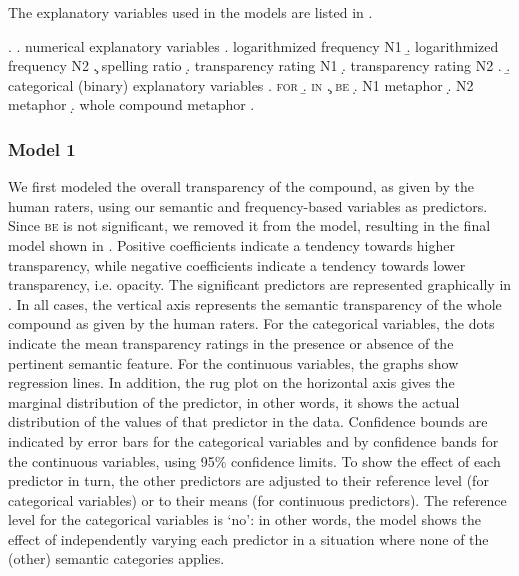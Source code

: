 The explanatory variables used in the models are listed in \Next.

\ex. \a. numerical explanatory variables
\a. logarithmized frequency N1
\b. logarithmized frequency N2
\c. spelling ratio
\d. transparency rating N1
\d. transparency rating N2
\z.
\b. categorical (binary) explanatory variables
\a. \textsc{for}
\b. \textsc{in}
\c. \textsc{be}
\d. N1 metaphor
\d. N2 metaphor
\d. whole compound metaphor
\z.

\subsubsection{Model 1}
We first modeled the overall transparency of the compound, as given by
the human raters, using our semantic and frequency-based variables as
predictors. Since \textsc{be} is not significant, we removed it from the model,
resulting in the final model shown in .
Positive coefficients indicate a tendency towards higher transparency, while negative coefficients indicate a tendency
towards lower transparency, i.e. opacity. 
The significant predictors are
represented graphically in . In all cases,
the vertical axis represents the semantic transparency of the whole compound as given by the human raters. For the categorical variables,
the dots indicate the mean transparency ratings in the presence or
absence of the pertinent semantic feature. For the continuous
variables, the graphs show regression lines. In addition, the rug plot on the horizontal axis gives the marginal distribution of the
predictor, in other words, it shows the actual distribution of the
values of that predictor in the data. Confidence bounds are indicated
by error bars for the categorical variables and by confidence bands
for the continuous variables, using 95\% confidence limits. 
To show the effect of
each predictor in turn, the other predictors are adjusted to their
reference level (for categorical variables) or to their means (for
continuous predictors). The reference level for the categorical
variables is ‘no’: in other words, the model shows the effect of
independently varying each predictor in a situation where none of the
(other) semantic categories applies.



